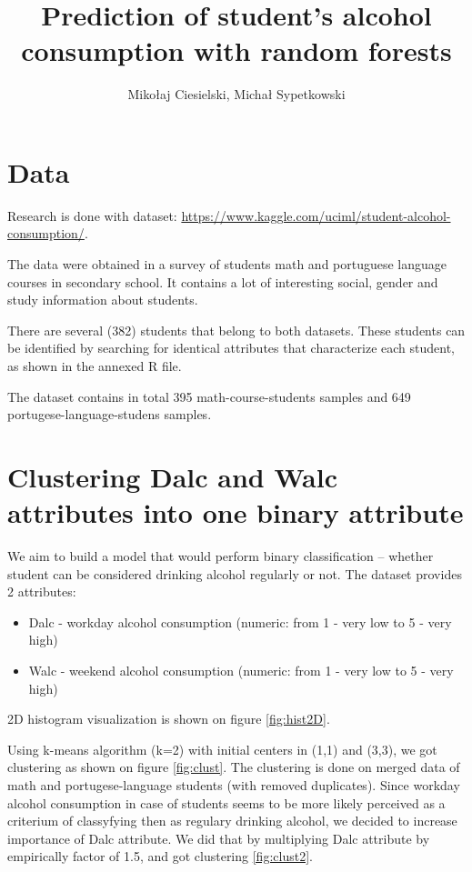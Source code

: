 \documentclass[a4paper]{article}
\begin{document}
\title{Prediction of student's alcohol consumption with random forests}

\author{Mikołaj Ciesielski, Michał Sypetkowski}
\maketitle

\tableofcontents
\newpage


\section{Data}

Research is done with dataset: \url{https://www.kaggle.com/uciml/student-alcohol-consumption/}.

The data were obtained in a survey of students
math and portuguese language courses in secondary school.
It contains a lot of interesting social,
gender and study information about students.

There are several (382) students that belong to both datasets.
These students can be identified by searching for identical attributes
that characterize each student, as shown in the annexed R file.

The dataset contains in total 395 math-course-students samples and 
649 portugese-language-studens samples.


\section{Clustering Dalc and Walc attributes into one binary attribute}

We aim to build a model that would perform binary classification --
whether student can be considered drinking alcohol regularly or not.
The dataset provides 2 attributes:
\begin{itemize}
    \item Dalc - workday alcohol consumption (numeric: from 1 - very low to 5 - very high)
    \item Walc - weekend alcohol consumption (numeric: from 1 - very low to 5 - very high)
\end{itemize}
2D histogram visualization is shown on figure \ref{fig:hist2D}.

Using k-means algorithm (k=2) with initial centers in (1,1) and (3,3), we got clustering as shown on figure \ref{fig:clust}.
The clustering is done on merged data of math and portugese-language students (with removed duplicates).
Since workday alcohol consumption in case of students seems
to be more likely perceived as a criterium of classyfying then as
regulary drinking alcohol,
we decided to increase importance of Dalc attribute.
We did that by multiplying Dalc attribute by empirically factor of 1.5, and got clustering \ref{fig:clust2}.
\end{document}
